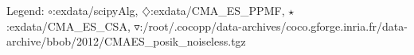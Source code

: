 Legend: {\color{NavyBlue}$\circ$}:exdata/scipyAlg, {\color{Magenta}$\diamondsuit$}:exdata/CMA\_ES\_PPMF, {\color{Orange}$\star$}:exdata/CMA\_ES\_CSA, {\color{CornflowerBlue}$\triangledown$}:/root/.cocopp/data-archives/coco.gforge.inria.fr/data-archive/bbob/2012/CMAES\_posik\_noiseless.tgz